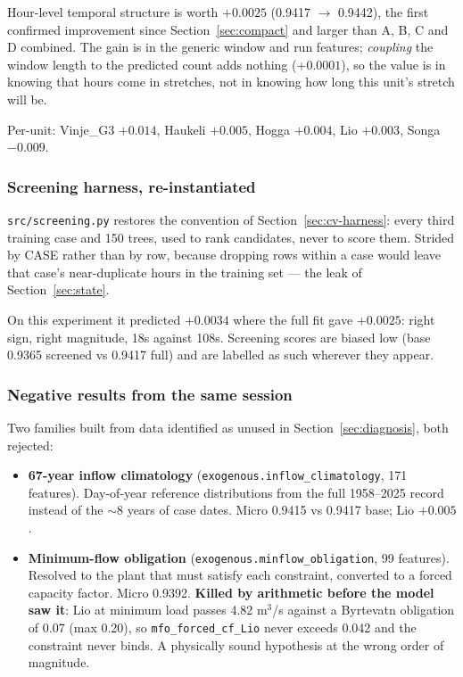 \begin{finding}
Hour-level temporal structure is worth \textbf{$+0.0025$} (0.9417 $\to$ 0.9442), the first
confirmed improvement since Section~\ref{sec:compact} and larger than A, B, C and D combined.
The gain is in the generic window and run features; \emph{coupling} the window length to the
predicted count adds nothing ($+0.0001$), so the value is in knowing that hours come in stretches,
not in knowing how long this unit's stretch will be.
\end{finding}

Per-unit: Vinje\_G3 $+0.014$, Haukeli $+0.005$, Hogga $+0.004$, Lio $+0.003$, Songa $-0.009$.

\subsubsection*{Screening harness, re-instantiated}

\texttt{src/screening.py} restores the convention of Section~\ref{sec:cv-harness}: every third
training case and 150 trees, used to rank candidates, never to score them. Strided by CASE rather
than by row, because dropping rows within a case would leave that case's near-duplicate hours in
the training set --- the leak of Section~\ref{sec:state}.

On this experiment it predicted $+0.0034$ where the full fit gave $+0.0025$: right sign, right
magnitude, 18s against 108s. Screening scores are biased low (base 0.9365 screened vs 0.9417
full) and are labelled as such wherever they appear.

\subsubsection*{Negative results from the same session}

Two families built from data identified as unused in Section~\ref{sec:diagnosis}, both rejected:

\begin{itemize}
  \item \textbf{67-year inflow climatology} (\texttt{exogenous.inflow\_climatology}, 171
        features). Day-of-year reference distributions from the full 1958--2025 record instead of
        the $\sim$8 years of case dates. Micro 0.9415 vs 0.9417 base; Lio $+0.005$.
  \item \textbf{Minimum-flow obligation} (\texttt{exogenous.minflow\_obligation}, 99 features).
        Resolved to the plant that must satisfy each constraint, converted to a forced capacity
        factor. Micro 0.9392. \textbf{Killed by arithmetic before the model saw it}: Lio at
        minimum load passes 4.82 m$^3$/s against a Byrtevatn obligation of 0.07 (max 0.20), so
        \texttt{mfo\_forced\_cf\_Lio} never exceeds 0.042 and the constraint never binds. A
        physically sound hypothesis at the wrong order of magnitude.
\end{itemize}

